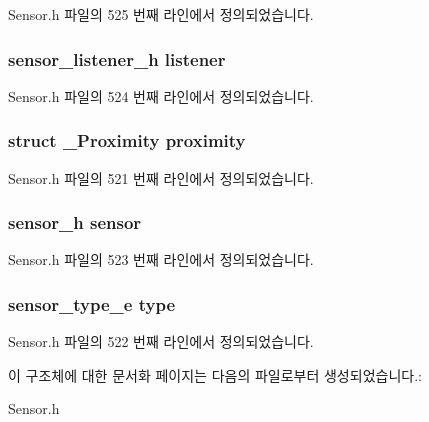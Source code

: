 Sensor.\-h 파일의 525 번째 라인에서 정의되었습니다.

\hypertarget{struct__ProximityExtend_aa977dfb866b24fd7d9a20a9a01b2fd1f}{
\subsubsection[{listener}]{\setlength{\rightskip}{0pt plus 5cm}sensor\-\_\-listener\-\_\-h listener}}\label{struct__ProximityExtend_aa977dfb866b24fd7d9a20a9a01b2fd1f}


Sensor.\-h 파일의 524 번째 라인에서 정의되었습니다.

\hypertarget{struct__ProximityExtend_a79740711df66cd887ecab71528fc1f70}{
\subsubsection[{proximity}]{\setlength{\rightskip}{0pt plus 5cm}struct {\bf \-\_\-\-Proximity} proximity}}\label{struct__ProximityExtend_a79740711df66cd887ecab71528fc1f70}


Sensor.\-h 파일의 521 번째 라인에서 정의되었습니다.

\hypertarget{struct__ProximityExtend_a5bae9b7801bc3808411925cde81d3f26}{
\subsubsection[{sensor}]{\setlength{\rightskip}{0pt plus 5cm}sensor\-\_\-h sensor}}\label{struct__ProximityExtend_a5bae9b7801bc3808411925cde81d3f26}


Sensor.\-h 파일의 523 번째 라인에서 정의되었습니다.

\hypertarget{struct__ProximityExtend_abffb09766da2fc510a79bb51f82a36e1}{
\subsubsection[{type}]{\setlength{\rightskip}{0pt plus 5cm}sensor\-\_\-type\-\_\-e type}}\label{struct__ProximityExtend_abffb09766da2fc510a79bb51f82a36e1}


Sensor.\-h 파일의 522 번째 라인에서 정의되었습니다.



이 구조체에 대한 문서화 페이지는 다음의 파일로부터 생성되었습니다.\-:\begin{DoxyCompactItemize}
\item 
Sensor.\-h\end{DoxyCompactItemize}
